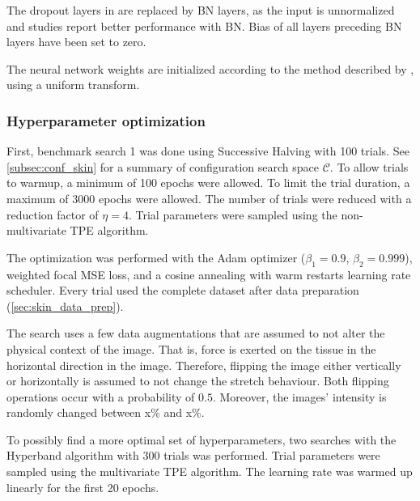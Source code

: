The dropout layers in \cite{Soylu2022} are replaced by BN layers, as the input is unnormalized and studies report better performance with BN.
Bias of all layers preceding BN layers have been set to zero.

The neural network weights are initialized according to the method described by \textcite{He2015a}, using a uniform transform.

\subsubsection{Hyperparameter optimization}
First, benchmark search 1 was done using Successive Halving with 100 trials.
See \cref{subsec:conf_skin} for a summary of configuration search space $\mathcal{C}$.
To allow trials to warmup, a minimum of 100 epochs were allowed.
To limit the trial duration, a maximum of 3000 epochs were allowed.
The number of trials were reduced with a reduction factor of $\eta=4$.
Trial parameters were sampled using the non-multivariate TPE algorithm.

The optimization was performed with the Adam optimizer ($\beta_1=0.9$, $\beta_2=0.999$), weighted focal MSE loss, and a cosine annealing with warm restarts learning rate scheduler.
Every trial used the complete dataset after data preparation (\cref{sec:skin_data_prep}).

The search uses a few data augmentations that are assumed to not alter the physical context of the image.
That is, force is exerted on the tissue in the horizontal direction in the image.
Therefore, flipping the image either vertically or horizontally is assumed to not change the stretch behaviour.
Both flipping operations occur with a probability of $0.5$.
Moreover, the images' intensity is randomly changed between x\% and x\%.

To possibly find a more optimal set of hyperparameters, two searches with the Hyperband algorithm with 300 trials was performed.
Trial parameters were sampled using the multivariate TPE algorithm.
The learning rate was warmed up linearly for the first 20 epochs.



